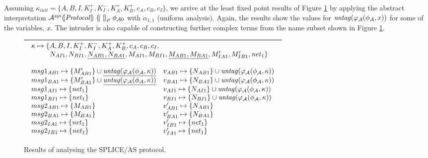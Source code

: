 \documentclass[10pt,a4paper,final,oneside,fleqn]{book}
\begin{document}
Assuming $\kappa_{init}=\{A,B,I,K^+_I,K^-_I,K^+_A,K^+_B,c_A,c_B,c_I\}$, we arrive at the least fixed point results of Figure \ref{ansplice} by applying the abstract interpretation $\mathcal{A}^{spi}(\![\mbox{{\itshape Protocol\/}}]\!)~\{\!|~|\!\}_\rho~\phi_{\mathcal{A}0}$ with $\alpha_{1,1}$ (uniform analysis).  Again, the results show the values for $\mbox{{\itshape untag\/}}(\varphi_\mathcal{A}(\phi_\mathcal{A},x))$ for some of the variables, $x$.  The intruder is also capable of constructing further complex terms from the name subset shown in Figure \ref{ansplice}.
\begin{figure}[bht]
\begin{center}
\begin{tabular}{|l|}
\hline

$\begin{array}{ll}
\multicolumn{2}{l}{\kappa\mapsto\{A,B,I,K^+_I,K^-_I,K^+_A,K^+_B,c_A,c_B,c_I,}\\
\multicolumn{2}{l}{~~~~~~~~N_{AI1},N_{BI1},\underline{N_{AB1},N_{BA1}},M_{AI1},M_{BI1},\underline{M_{AB1},M_{BA1}},M'_{IA1},M'_{IB1},\mbox{{\itshape net\/}}_1\}}\\\\
msg1_{AB1}\mapsto\{M'_{AB1}\}\cup\underline{\mbox{{\itshape untag\/}}(\varphi_\mathcal{A}(\phi_\mathcal{A},\kappa))}&v_{AB1}\mapsto\{N_{AB1}\}\cup\mbox{{\itshape untag\/}}(\varphi_\mathcal{A}(\phi_\mathcal{A},\kappa))\\
msg1_{BA1}\mapsto\{M'_{BA1}\}\cup\underline{\mbox{{\itshape untag\/}}(\varphi_\mathcal{A}(\phi_\mathcal{A},\kappa))}&v_{BA1}\mapsto\{N_{BA1}\}\cup\mbox{{\itshape untag\/}}(\varphi_\mathcal{A}(\phi_\mathcal{A},\kappa))\\
msg1_{AI1}\mapsto\{\mbox{{\itshape net\/}}_1\}&v_{AI1}\mapsto\{N_{AI1}\}\cup\mbox{{\itshape untag\/}}(\varphi_\mathcal{A}(\phi_\mathcal{A},\kappa))\\
msg1_{BI1}\mapsto\{\mbox{{\itshape net\/}}_1\}&v_{BI1}\mapsto\{N_{BI1}\}\cup\mbox{{\itshape untag\/}}(\varphi_\mathcal{A}(\phi_\mathcal{A},\kappa))\\
msg2_{AB1}\mapsto\{M_{AB1}\}&v'_{AB1}\mapsto\{N_{AB1}\}\\
msg2_{BA1}\mapsto\{M_{BA1}\}&v'_{BA1}\mapsto\{N_{BA1}\}\\
msg2_{IA1}\mapsto\{\mbox{{\itshape net\/}}_1\}&v'_{IB1}\mapsto\{\mbox{{\itshape net\/}}_1\}\\
msg2_{IB1}\mapsto\{\mbox{{\itshape net\/}}_1\}&v'_{IA1}\mapsto\{\mbox{{\itshape net\/}}_1\}\\
\end{array}$\\
\hline
\end{tabular}
\end{center}
\caption{Results of analysing the SPLICE/AS protocol.\label{ansplice}}
\end{figure}
\end{document}
